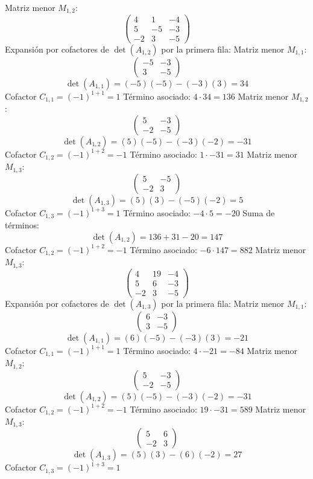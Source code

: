 \documentclass{article}
\begin{document}
Matriz menor $M_{1,2}$:
\[\begin{pmatrix}4 & 1 & -4 \\ 5 & -5 & -3 \\ -2 & 3 & -5\end{pmatrix}\]
Expansión por cofactores de $\det(A_{1,2})$ por la primera fila:
Matriz menor $M_{1,1}$:
\[\begin{pmatrix}-5 & -3 \\ 3 & -5\end{pmatrix}\]
\[\det(A_{1,1}) = (-5)(-5) - (-3)(3) = 34\]
Cofactor $C_{1,1} = (-1)^{1+1} = 1$
Término asociado: $ 4 \cdot 34 = 136 $
Matriz menor $M_{1,2}$:
\[\begin{pmatrix}5 & -3 \\ -2 & -5\end{pmatrix}\]
\[\det(A_{1,2}) = (5)(-5) - (-3)(-2) = -31\]
Cofactor $C_{1,2} = (-1)^{1+2} = -1$
Término asociado: $ 1 \cdot -31 = 31 $
Matriz menor $M_{1,3}$:
\[\begin{pmatrix}5 & -5 \\ -2 & 3\end{pmatrix}\]
\[\det(A_{1,3}) = (5)(3) - (-5)(-2) = 5\]
Cofactor $C_{1,3} = (-1)^{1+3} = 1$
Término asociado: $ -4 \cdot 5 = -20 $
Suma de términos:
\[\det(A_{1,2}) = 136 + 31 - 20 = 147\]
Cofactor $C_{1,2} = (-1)^{1+2} = -1$
Término asociado: $ -6 \cdot 147 = 882 $
Matriz menor $M_{1,3}$:
\[\begin{pmatrix}4 & 19 & -4 \\ 5 & 6 & -3 \\ -2 & 3 & -5\end{pmatrix}\]
Expansión por cofactores de $\det(A_{1,3})$ por la primera fila:
Matriz menor $M_{1,1}$:
\[\begin{pmatrix}6 & -3 \\ 3 & -5\end{pmatrix}\]
\[\det(A_{1,1}) = (6)(-5) - (-3)(3) = -21\]
Cofactor $C_{1,1} = (-1)^{1+1} = 1$
Término asociado: $ 4 \cdot -21 = -84 $
Matriz menor $M_{1,2}$:
\[\begin{pmatrix}5 & -3 \\ -2 & -5\end{pmatrix}\]
\[\det(A_{1,2}) = (5)(-5) - (-3)(-2) = -31\]
Cofactor $C_{1,2} = (-1)^{1+2} = -1$
Término asociado: $ 19 \cdot -31 = 589 $
Matriz menor $M_{1,3}$:
\[\begin{pmatrix}5 & 6 \\ -2 & 3\end{pmatrix}\]
\[\det(A_{1,3}) = (5)(3) - (6)(-2) = 27\]
Cofactor $C_{1,3} = (-1)^{1+3} = 1$
\end{document}
